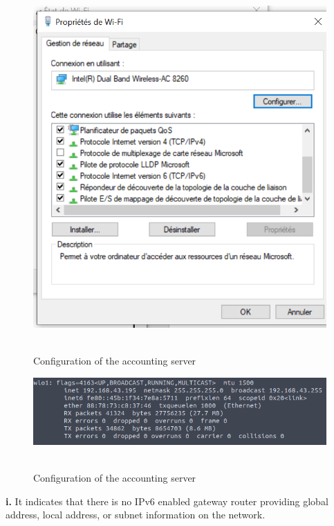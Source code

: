 \documentclass[conference]{IEEEtran}
\begin{document}
\begin{center}
\begin{figure}[h]
\includegraphics[scale=0.35]{resources/q1e.png}\
\caption{Configuration of the accounting server}
\label{server_acc}
\end{figure}
\end{center}

\begin{center}
\begin{figure}[h]
\includegraphics[scale=0.45]{resources/q1f.png}\
\caption{Configuration of the accounting server}
\label{server_acc}
\end{figure}
\end{center}

\textbf{i.} It indicates that there is no IPv6 enabled gateway router providing global address, local address, or subnet information on the network.
\end{document}
